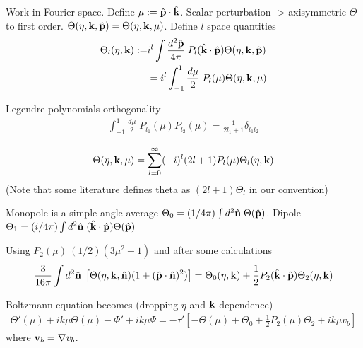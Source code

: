 Work in Fourier space. Define $\mu := \hat{\mathbf{p}}\cdot\hat{\mathbf{k}}$. Scalar perturbation -> axisymmetric $\Theta$ to first order. $\Theta(\eta,\mathbf{k},\hat{\mathbf{p}}) = \Theta(\eta,\mathbf{k},\mu)$. Define $l$ space quantities
\begin{align}
	\Theta_l (\eta,\mathbf{k}) :=& i^l \int \frac{d^2 \hat{\mathbf{p}}}{4\pi} \; P_l (\hat{\mathbf{k}} \cdot \hat{\mathbf{p}}) \Theta(\eta, \mathbf{k}, \hat{\mathbf{p}}) \\
	&= i^l \int^1_{-1} \frac{d\mu}{2} \; P_l (\mu) \Theta(\eta, \mathbf{k}, \mu)
\end{align}

Legendre polynomials orthogonality
\begin{align}
	\int_{-1}^{1} \frac{d\mu}{2} \; P_{l_1}(\mu) P_{l_2}(\mu) = \frac{1}{2l_1 + 1} \delta_{l_1 l_2}
\end{align}

\begin{align}
	\Theta(\eta,\mathbf{k},\mu) = \sum_{l=0}^{\infty} (-i)^l (2l+1) P_l (\mu) \Theta_l (\eta, \mathbf{k})
\end{align}
(Note that some literature defines theta as $(2l+1)\Theta_l$ in our convention)

Monopole is a simple angle average $\Theta_0 = (1/4\pi) \int d^2\hat{\mathbf{n}} \; \Theta(\hat{\mathbf{p}})$. Dipole $\Theta_1 = (i/4\pi) \int d^2\hat{\mathbf{n}} \; (\hat{\mathbf{k}} \cdot \hat{\mathbf{p}}) \Theta(\hat{\mathbf{p}})$

Using $P_2(\mu) \ (1/2)(3\mu^2 -1)$ and after some calculations
\begin{align}
	\frac{3}{16\pi} \int d^2\hat{\mathbf{n}} \; \left[ \Theta(\eta,\mathbf{k},\hat{\mathbf{n}}) (1 + (\hat{\mathbf{p}} \cdot \hat{\mathbf{n}})^2) \right] = \Theta_0 (\eta,\mathbf{k}) + \frac{1}{2} P_2 (\hat{\mathbf{k}} \cdot \hat{\mathbf{p}}) \Theta_2(\eta, \mathbf{k}) 
\end{align}

Boltzmann equation becomes (dropping $\eta$ and $\mathbf{k}$ dependence)
\begin{align}
	\Theta'(\mu) + ik\mu \Theta(\mu) - \Phi' + ik\mu\Psi = -\tau' \left[ - \Theta(\mu) + \Theta_0 + \frac{1}{2}P_2(\mu)\Theta_2 + ik\mu v_b \right]
\end{align}
where $\mathbf{v}_b = \nabla v_b$.

